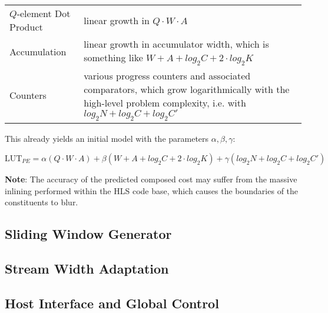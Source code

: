 \documentclass[DIV12]{scrreprt}
\begin{document}
\noindent\begin{tabularx}{\linewidth}{lX}\toprule
  $Q$-element Dot Product & linear growth in $Q\cdot W\cdot A$\\
  Accumulation            & linear growth in accumulator width,\newline
                            which is something like
                            $W+A+log_2 C+2\cdot log_2 K$\\
  Counters                & various progress counters and associated
                            comparators, which grow logarithmically
                            with the high-level problem complexity,
                            i.e. with $log_2 N + log_2 C + log_2 C'$\\\bottomrule
\end{tabularx}

This already yields an initial model with the parameters
$\alpha, \beta, \gamma$:

\[\mbox{LUT}_{PE}=
\alpha\left(Q\cdot W\cdot A\right) +
\beta\left(W+A+log_2 C+2\cdot log_2 K\right) +
\gamma\left(log_2 N + log_2 C + log_2 C'\right)\]

\textbf{Note}: The accuracy of the predicted composed cost may suffer
from the massive inlining performed within the HLS code base, which
causes the boundaries of the constituents to blur.

\subsection{Sliding Window Generator}

\subsection{Stream Width Adaptation}

\subsection{Host Interface and Global Control}
\end{document}
